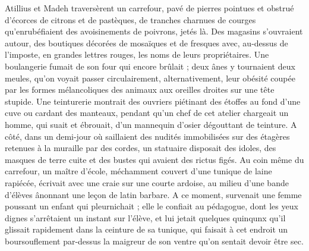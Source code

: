 \documentclass[a4paper, 11pt, oneside, polutonikogreek, french]{article}
\begin{document}
Atillius et Madeh traversèrent un carrefour, pavé de pierres pointues et obstrué d'écorces de citrons et de pastèques, de tranches charnues de courges qu'enrubéfiaient des avoisinements de poivrons, jetés là. Des magasins s'ouvraient autour, des boutiques décorées de mosaïques et de fresques avec, au-dessus de l'imposte, en grandes lettres rouges, les noms de leurs propriétaires. Une boulangerie fumait de son four qui encore brûlait ; deux ânes y tournaient deux meules, qu'on voyait passer circulairement, alternativement, leur obésité coupée par les formes mélancoliques des animaux aux oreilles droites sur une tête stupide. Une teinturerie montrait des ouvriers piétinant des étoffes au fond d'une cuve ou cardant des manteaux, pendant qu'un chef de cet atelier chargeait un homme, qui suait et ébrouait, d'un mannequin d'osier dégouttant de teinture. A côté, dans un demi-jour où saillaient des nudités immobilisées sur des étagères retenues à la muraille par des cordes, un statuaire disposait des idoles, des masques de terre cuite et des bustes qui avaient des rictus figés. Au coin même du carrefour, un maître d'école, méchamment couvert d'une tunique de laine rapiécée, écrivait avec une craie sur une courte ardoise, au milieu d'une bande d'élèves ânonnant une leçon de latin barbare. A ce moment, survenait une femme poussant un enfant qui pleurnichait ; elle le confiait au pédagogue, dont les yeux dignes s'arrêtaient un instant sur l'élève, et lui jetait quelques quinqunx qu'il glissait rapidement dans la ceinture de sa tunique, qui faisait à cet endroit un boursouflement par-dessus la maigreur de son ventre qu'on sentait devoir être sec.
\clearpage
\subsection{}
\end{document}
